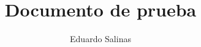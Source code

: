 \documentclass{article}
\begin{document}
\title{Documento de prueba}
\author{Eduardo Salinas}
\end{document}
